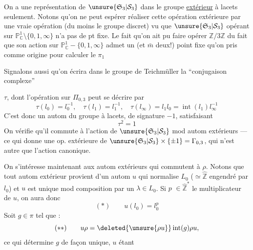 On a une représentation de $\unsure{\mathfrak S_3|\mathcal S_3}$ dans le groupe \uline{extérieur} à lacets seulement. Notons qu'on ne peut espérer réaliser cette opération extérieure par une vraie opération (du moins  le groupe discret) vu que $\unsure{\mathfrak S_3|\mathcal S_3}$ opérant sur $\mathbb P^1_{\mathbb C}\setminus\{0,1,\infty\}$ n'a pas de pt fixe. Le fait qu'on ait pu faire opérer $\mathbb Z/3\mathbb Z$   du fait que son action sur $\mathbb P^1_{\mathbb C}-\{0,1,\infty\}$ admet un (et $\bar m$ deux!) point fixe qu'on   pris comme origine pour calculer le $\pi_1$

Signalons aussi qu'on écrira dans le groupe de Teichmüller  la ``conjugaison complexe''

$\tau$, dont l'opération sur $\Pi_{0,3}$ peut se décrire par
\[
\tau(l_0)=l_0^{-1},\quad\tau(l_1)=l_1^{-1},\quad\tau(l_\infty)=l_1l_0=\operatorname{int}(l_1)l_\infty^{-1}
\]
C'est donc un autom du groupe à lacets, de signature $-1$, satisfaisant
\[
\tau^2=1
\]
On vérifie qu'il commute à l'action de $\unsure{\mathfrak S_3|\mathcal S_3}$ mod autom extérieurs --- ce qui donne une op. extérieure de $\unsure{\mathfrak S_3|\mathcal S_3}\times\{\pm1\}=\Gamma_{0,3}$, qui n'est autre que l'action canonique.

On s'intéresse maintenant aux autom extérieurs qui commutent à $\rho$. Notons que tout autom extérieur  provient d'un autom $u$ qui normalise  $L_0$ ($\simeq\hat{\mathbb Z}$ engendré par $l_0$) et $u$ est unique mod composition par un $\lambda\in L_0$. Si $p$  $\in\hat{\mathbb Z}^{*}$  le multiplicateur de $u$, on aura donc
\[
(*)\qquad u(l_0)=l_0^p
\]
Soit $g\in\pi$ tel que :
\[
(**)\qquad u\rho=\deleted{\unsure{\rho u}}\operatorname{int}(g)\rho u,
\]
ce qui détermine $g$ de façon unique, $u$ étant

